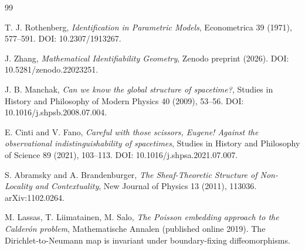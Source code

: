\documentclass[11pt]{article}
\begin{document}
\begin{thebibliography}{99}

T. J. Rothenberg,
\emph{Identification in Parametric Models},
Econometrica 39 (1971), 577--591.
DOI: 10.2307/1913267.

J. Zhang,
\emph{Mathematical Identifiability Geometry},
Zenodo preprint (2026).
DOI: 10.5281/zenodo.22023251.

J. B. Manchak,
\emph{Can we know the global structure of spacetime?},
Studies in History and Philosophy of Modern Physics 40 (2009), 53--56.
DOI: 10.1016/j.shpsb.2008.07.004.

E. Cinti and V. Fano,
\emph{Careful with those scissors, Eugene! Against the observational
indistinguishability of spacetimes},
Studies in History and Philosophy of Science 89 (2021), 103--113.
DOI: 10.1016/j.shpsa.2021.07.007.

S. Abramsky and A. Brandenburger,
\emph{The Sheaf-Theoretic Structure of Non-Locality and Contextuality},
New Journal of Physics 13 (2011), 113036.
arXiv:1102.0264.

M. Lassas, T. Liimatainen, M. Salo,
\emph{The Poisson embedding approach to the Calderón problem},
Mathematische Annalen (published online 2019).
The Dirichlet-to-Neumann map is invariant under boundary-fixing
diffeomorphisms.

\end{thebibliography}
\end{document}
